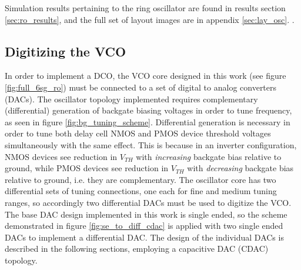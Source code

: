 		Simulation results pertaining to the ring oscillator are found in results section \ref{sec:ro_results}, and the full set of layout images are in appendix \ref{sec:lay_osc}.
\FloatBarrier
{\color{white}.}

	




	\FloatBarrier\pagebreak
	\subsection{Digitizing the VCO}
	In order to implement a DCO, the VCO core designed in this work (see figure \ref{fig:full_6sg_ro}) must be connected to a set of digital to analog converters (DACs). The oscillator topology implemented requires complementary (differential) generation of backgate biasing voltages in order to tune frequency, as seen in figure \ref{fig:bg_tuning_scheme}. Differential generation is necessary in order to tune both delay cell NMOS and PMOS device threshold voltages simultaneously with the same effect. This is because in an inverter configuration, NMOS devices see reduction in $V_{TH}$ with \textit{increasing} backgate bias relative to ground, while PMOS devices see reduction in $V_{TH}$ with \textit{decreasing} backgate bias relative to ground, i.e. they are complementary. The oscillator core has two differential sets of tuning connections, one each for fine and medium tuning ranges, so accordingly two differential DACs must be used to digitize the VCO. The base DAC design implemented in this work is single ended, so the scheme demonstrated in figure \ref{fig:se_to_diff_cdac} is applied with two single ended DACs to implement a differential DAC. The design of the individual DACs is described in the following sections, employing a capacitive DAC (CDAC) topology.
